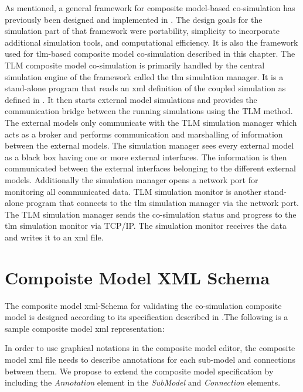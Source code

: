 As men\-tioned, a gen\-eral frame\-work for com\-pos\-ite model-based co-simulation has pre\-vi\-ously 
been de\-signed and im\-ple\-mented in  \cite{tlmalexander05}. The design goals for the simulation part of that framework
were portability, simplicity to incorporate additional simulation tools, and computational efficiency. 
It is also the framework used for \acrshort{tlm}-based composite model co-simulation described in this chapter.
The TLM composite model co-simulation is primarily handled by the central simulation engine of the framework 
called the \acrshort{tlm} simulation manager. It is a stand-alone program that reads an \acrshort{xml} definition
of the coupled simulation as defined in \cite{tlmalexander05}. It then starts external model simulations and
provides the communication bridge between the running simulations using the TLM \cite{tlmlakov06} method. 
The external models only communicate with the TLM simulation manager which acts as a broker and
performs communication and marshalling of information between the external models. The
simulation manager sees every external model as a black box having one or more external interfaces. The
information is then communicated between the external interfaces belonging to the different external models.
Additionally the simulation manager opens a network port for monitoring all communicated data.
TLM simulation monitor is another stand-alone program that connects to the \acrshort{tlm} simulation manager via the network port. 
The TLM simulation manager sends the co-simulation status and progress to the \acrshort{tlm}
simulation monitor via TCP/IP. The simulation monitor receives the data and writes it to an \acrshort{xml} file.

\section{Compoiste Model XML Schema}
\label{sec:tlmschema}

The composite model \acrshort{xml}-Schema for validating the co-simulation composite model is designed according
to its specification described in \cite{tlmalexander05}.The following is a sample composite model \acrshort{xml} representation:



In order to use graphical notations in the composite model editor, the composite model \acrshort{xml} file needs to describe annotations for each sub-model and connections between them. We propose to extend the composite model specification by including the \textit{Annotation}  element in the \textit{SubModel} and \textit{Connection} elements.

